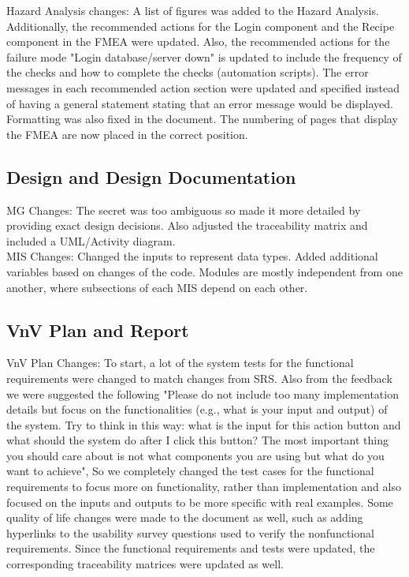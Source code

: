 \documentclass{article}
\begin{document}
Hazard Analysis changes: A list of figures was added to the Hazard Analysis. Additionally, the recommended actions for the Login component and the Recipe component in the FMEA were updated. Also, the recommended actions for the failure mode "Login database/server down" is updated to include the frequency of the checks and how to complete the checks (automation scripts). The error messages in each recommended action section were updated and specified instead of having a general statement stating that an error message would be displayed. Formatting was also fixed in the document. The numbering of pages that display the FMEA are now placed in the correct position. 

\subsection{Design and Design Documentation}

MG Changes: The secret was too ambiguous so made it more detailed by providing exact design decisions. Also adjusted the traceability matrix and  included a UML/Activity diagram. \\

MIS Changes: Changed the inputs to represent data types. Added additional variables based on changes of the code. Modules are mostly independent from one another, where subsections of each MIS depend on each other.

\subsection{VnV Plan and Report}

VnV Plan Changes: To start, a lot of the system tests for the functional requirements were changed to match changes from SRS. Also from the feedback we were suggested the following "Please do not include too many implementation details but focus on the functionalities (e.g., what is your input and output) of the system. Try to think in this way: what is the input for this action button and what should the system do after I click this button? The most important thing you should care about is not what components you are using but what do you want to achieve", So we completely changed the test cases for the functional requirements to focus more on functionality, rather than implementation and also focused on the inputs and outputs to be more specific with real examples. Some quality of life changes were made to the document as well, such as adding hyperlinks to the usability survey questions used to verify the nonfunctional requirements. Since the functional requirements and tests were updated, the corresponding traceability matrices were updated as well. \\
\end{document}
